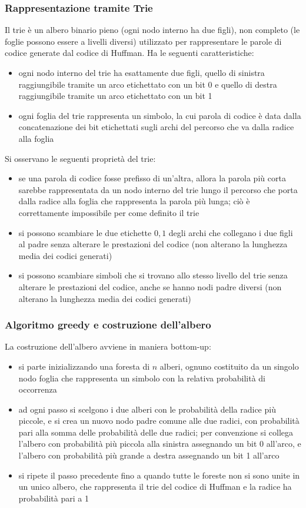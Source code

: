 \subsubsection*{Rappresentazione tramite Trie}
Il trie è un albero binario pieno (ogni nodo interno ha due figli), non completo (le foglie possono essere a livelli diversi)
utilizzato per rappresentare le parole di codice generate dal codice di Huffman. Ha le seguenti caratteristiche:
\begin{itemize}
	\item ogni nodo interno del trie ha esattamente due figli, quello di sinistra raggiungibile tramite un arco etichettato
	con un bit 0 e quello di destra raggiungibile tramite un arco etichettato con un bit 1
	\item ogni foglia del trie rappresenta un simbolo, la cui parola di codice è data dalla concatenazione dei bit etichettati
	sugli archi del percorso che va dalla radice alla foglia
\end{itemize}
Si osservano le seguenti proprietà del trie:
\begin{itemize}
	\item se una parola di codice fosse prefisso di un'altra, allora la parola più corta sarebbe rappresentata da un
	nodo interno del trie lungo il percorso che porta dalla radice alla foglia che rappresenta la parola più lunga; ciò è
	correttamente impossibile per come definito il trie
	\item si possono scambiare le due etichette \(0,1\) degli archi che collegano i due figli al padre senza alterare
	le prestazioni del codice (non alterano la lunghezza media dei codici generati)
	\item si possono scambiare simboli che si trovano allo stesso livello del trie senza alterare le prestazioni del codice,
	anche se hanno nodi padre diversi (non alterano la lunghezza media dei codici generati)
\end{itemize}

\subsubsection*{Algoritmo greedy e costruzione dell'albero}
La costruzione dell'albero avviene in maniera bottom-up:
\begin{itemize}
	\item si parte inizializzando una foresta di \(n\) alberi, ognuno costituito da un singolo nodo foglia che rappresenta
	un simbolo con la relativa probabilità di occorrenza
	\item ad ogni passo si scelgono i due alberi con le probabilità della radice più piccole, e si crea un nuovo nodo padre
	comune alle due radici, con probabilità pari alla somma delle probabilità delle due radici; per convenzione si collega
	l'albero con probabilità più piccola alla sinistra assegnando un bit 0 all'arco, e l'albero con probabilità più grande
	a destra assegnando un bit 1 all'arco
	\item si ripete il passo precedente fino a quando tutte le foreste non si sono unite in un unico albero, che rappresenta
	il trie del codice di Huffman e la radice ha probabilità pari a 1
\end{itemize}

